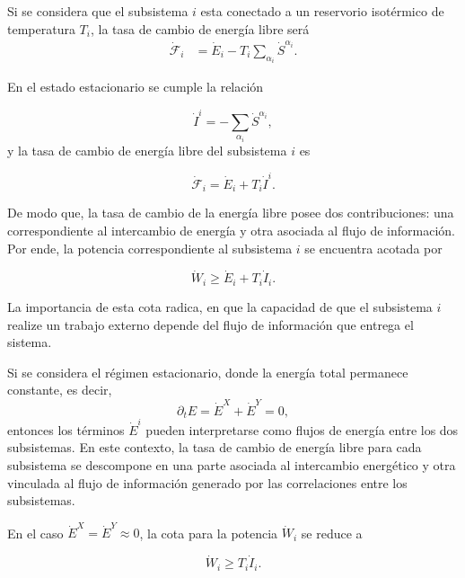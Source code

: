 Si se considera que el subsistema $i$ esta conectado a un reservorio isotérmico de temperatura $T_i$, la tasa de cambio de energía libre será
\begin{align*}
    \dot{\mathcal{F}}_{i} & = \dot{E}_{i} - T_{i} \sum_{\alpha_{i}}\dot{S}^{\alpha_{i}}. 
\end{align*}

En el estado estacionario se cumple la relación

\begin{equation*}
    \dot{I}^{i} = - \sum_{\alpha_{i}}\dot{S}^{\alpha_{i}},
\end{equation*}
y la tasa de cambio de energía libre del subsistema $i$ es 

\begin{equation*}
    \dot{\mathcal{F}}_{i} = \dot{E}_{i} + T_{i} \dot{I}^{i}.
\end{equation*}

De modo que, la tasa de cambio de la energía libre posee dos contribuciones: una correspondiente al intercambio de energía y otra asociada al flujo de información. Por ende, la potencia correspondiente al subsistema $i$ se encuentra acotada por

\begin{equation*}
    \dot{W}_{i} \geq \dot{E}_{i} + T_{i}\dot{I}_{i}.
\end{equation*}

La importancia de esta cota radica, en que la capacidad de que el subsistema $i$ realize un trabajo externo depende del flujo de información que entrega el sistema.

Si se considera el régimen estacionario, donde la energía total permanece constante, es decir,
\begin{equation*}
    \partial_{t}E = \dot{E}^{X} + \dot{E}^{Y} = 0,
\end{equation*}
entonces los términos $\dot{E}^{i}$ pueden interpretarse como flujos de energía entre los dos subsistemas. En este contexto, la tasa de cambio de energía libre para cada subsistema se descompone en una parte asociada al intercambio energético y otra vinculada al flujo de información generado por las correlaciones entre los subsistemas.

En el caso $\dot{E}^{X} = \dot{E}^{Y} \approx 0 $, la cota para la potencia $\dot{W}_{i}$ se reduce a 

\begin{equation*}
     \dot{W}_{i} \geq T_{i}\dot{I}_{i}.
\end{equation*}

